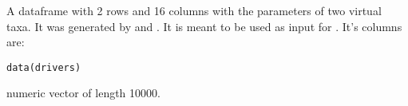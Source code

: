 \documentclass[letterpaper]{book}
\begin{document}
%
\begin{Description}\relax
A dataframe with 2 rows and 16 columns with the parameters of two virtual taxa. It was generated by  and . It is meant to be used as input for . It's columns are:
\end{Description}
%
\begin{Usage}
\begin{verbatim}
data(drivers)
\end{verbatim}
\end{Usage}
%
\begin{Format}
numeric vector of length 10000.
\end{Format}
%
\begin{Details}\relax
\begin{itemize}


\end{itemize}
\end{Details}
\end{document}
